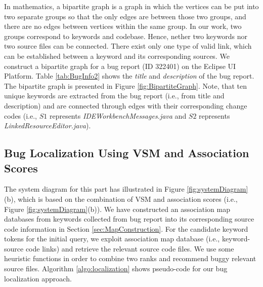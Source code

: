 \documentclass[conference]{IEEEtran}
\begin{document}
In mathematics, a bipartite graph is a graph in which the vertices can be put into two separate groups so that the only edges are between those two groups, and there are no edges between vertices within the same group. 
In our work, two groups correspond to keywords and codebase. Hence, nether two keywords nor two source files can be connected. There exist only one type of valid link, which can be established between a keyword and its corresponding sources. 
We construct a bipartite graph for a bug report (ID 322401) on the Eclipse UI Platform. Table \ref{tab:BugInfo2} shows the \textit{title} and \textit{description} of the bug report. The bipartite graph is presented in Figure \ref{fig:BipartiteGraph}. Note, that ten unique keywords are extracted from the bug report (i.e., from title and description) and are connected through edges with their corresponding change codes (i.e., $S1$ represents 
\textit{IDEWorkbenchMessages.java} and $S2$ represents 
\textit{LinkedResourceEditor.java}). 
\subsection{Bug Localization Using VSM and Association Scores}

The system diagram for this part has illustrated in Figure \ref{fig:systemDiagram}(b), which 
is based on the combination of VSM and association scores (i.e., Figure \ref{fig:systemDiagram}(b)).
We have constructed an association map databases from keywords collected from bug report into its corresponding source code information in Section \ref{sec:MapConstruction}.
For the candidate keyword tokens for the initial query, we exploit association map database (i.e., keyword-source code links) and retrieve the relevant source code files. We use some heuristic functions in order to combine two ranks and recommend buggy relevant source files. Algorithm \ref{algo:localization} shows pseudo-code for our bug localization approach.
\end{document}

